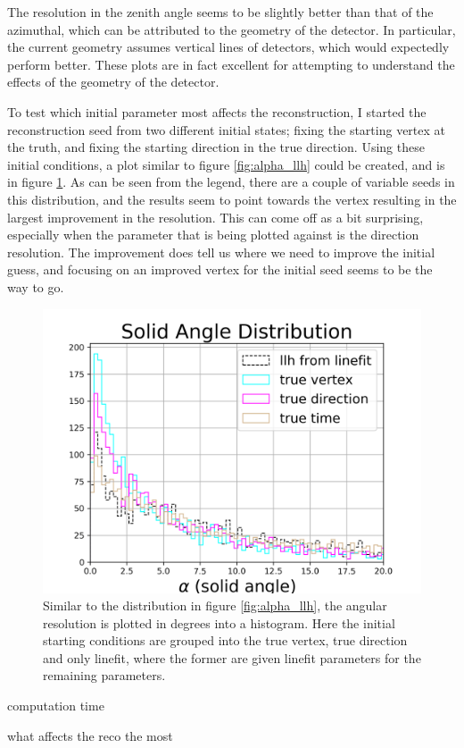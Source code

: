 The resolution in the zenith angle seems to be slightly better than that of the azimuthal, which can be attributed to the geometry of the detector. In particular, the current geometry assumes vertical lines of detectors, which would expectedly perform better. These plots are in fact excellent for attempting to understand the effects of the geometry of the detector.

To test which initial parameter most affects the reconstruction, I started the reconstruction seed from two different initial states; fixing the starting vertex at the truth, and fixing the starting direction in the true direction. Using these initial conditions, a plot similar to figure \ref{fig:alpha_llh} could be created, and is in figure \ref{fig:alpha_llh_test}. As can be seen from the legend, there are a couple of variable seeds in this distribution, and the results seem to point towards the vertex resulting in the largest improvement in the resolution. This can come off as a bit surprising, especially when the parameter that is being plotted against is the direction resolution. The improvement does tell us where we need to improve the initial guess, and focusing on an improved vertex for the initial seed seems to be the way to go.

\begin{figure}[H]
  \centering
  \includegraphics[width=12cm]{./Figures/reco_plots/alpha_dist_llh_seedcomparison.png}
  \caption{Similar to the distribution in figure \ref{fig:alpha_llh}, the angular resolution is plotted in degrees into a histogram. Here the initial starting conditions are grouped into the true vertex, true direction and only linefit, where the former are given linefit parameters for the remaining parameters.}
  \label{fig:alpha_llh_test}
\end{figure}




computation time

what affects the reco the most


